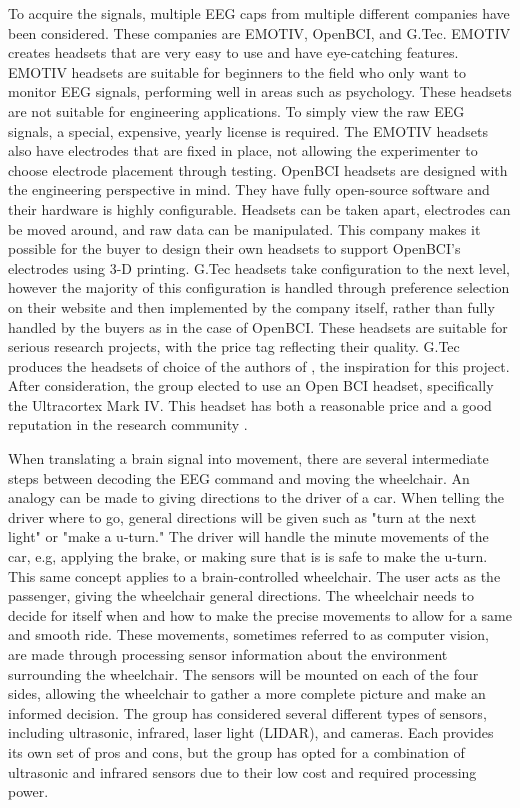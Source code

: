 \documentclass[conference]{IEEEtran}
\begin{document}
    To acquire the signals, multiple EEG caps from multiple different companies have been considered. These companies are EMOTIV, OpenBCI, and G.Tec. EMOTIV creates headsets that are very easy to use and have eye-catching features. EMOTIV headsets are suitable for beginners to the field who only want to monitor EEG signals, performing well in areas such as psychology. These headsets are not suitable for engineering applications. To simply view the raw EEG signals, a special, expensive, yearly license is required. The EMOTIV headsets also have electrodes that are fixed in place, not allowing the experimenter to choose electrode placement through testing. OpenBCI headsets are designed with the engineering perspective in mind. They have fully open-source software and their hardware is highly configurable. Headsets can be taken apart, electrodes can be moved around, and raw data can be manipulated. This company makes it possible for the buyer to design their own headsets to support OpenBCI's electrodes using 3-D printing. G.Tec headsets take configuration to the next level, however the majority of this configuration is handled through preference selection on their website and then implemented by the company itself, rather than fully handled by the buyers as in the case of OpenBCI. These headsets are suitable for serious research projects, with the price tag reflecting their quality. G.Tec produces the headsets of choice of the authors of \cite{learning_to_control}, the inspiration for this project. After consideration, the group elected to use an Open BCI headset, specifically the Ultracortex Mark IV. This headset has both a reasonable price and a good reputation in the research community \cite{openbci-research}.
    
    When translating a brain signal into movement, there are several intermediate steps between decoding the EEG command and moving the wheelchair. An analogy can be made to giving directions to the driver of a car. When telling the driver where to go, general directions will be given such as "turn at the next light" or "make a u-turn." The driver will handle the minute movements of the car, e.g, applying the brake, or making sure that is is safe to make the u-turn. This same concept applies to a brain-controlled wheelchair. The user acts as the passenger, giving the wheelchair general directions. The wheelchair needs to decide for itself when and how to make the precise movements to allow for a same and smooth ride. These movements, sometimes referred to as computer vision, are made through processing sensor information about the environment surrounding the wheelchair. The sensors will be mounted on each of the four sides, allowing the wheelchair to gather a more complete picture and make an informed decision. The group has considered several different types of sensors, including ultrasonic, infrared, laser light (LIDAR), and cameras. Each provides its own set of pros and cons, but the group has opted for a combination of ultrasonic and infrared sensors due to their low cost and required processing power.  
    
\end{document}
